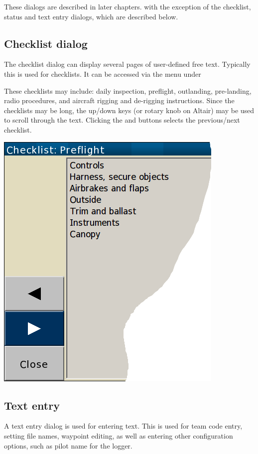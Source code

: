 These dialogs are described in later chapters. with the exception of the
checklist, status and text entry dialogs, which are described below.

\subsection*{Checklist dialog}\label{sec:checklist}
The checklist dialog can display several pages of user-defined free text.
Typically this is used for checklists. It can be accessed via the menu under 
\begin{quote}
\blink{}
\end{quote}

These checklists may include: daily inspection, preflight, outlanding,
pre-landing, radio procedures, and aircraft rigging and de-rigging
instructions.  Since the checklists may be long, the up/down keys (or rotary
knob on Altair) may be used to scroll through the text. Clicking the
\button{$<$} and \button{$>$} buttons selects the previous/next checklist.

\begin{center}
\includegraphics[angle=0,width=0.8\linewidth,keepaspectratio='true']{figures/checklist.png}
\end{center}


\subsection*{Text entry} \label{sec:textentry}
A text entry dialog is used for entering text.  This is used for team
code entry, setting file names, waypoint editing, as well as entering
other configuration options, such as pilot name for the logger.

